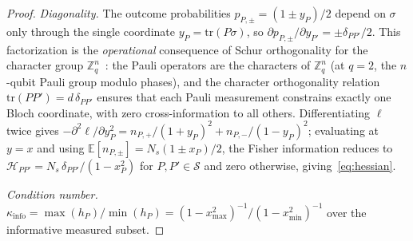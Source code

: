 \documentclass[twocolumn,prx,aps,superscriptaddress,longbibliography,floatfix]{revtex4-2}
\begin{document}
\begin{proof}
\emph{Diagonality.}
The outcome probabilities $p_{P,\pm} = (1 \pm y_P)/2$
depend on $\sigma$ only through the single coordinate
$y_P = \mathrm{tr}(P\sigma)$, so
$\partial p_{P,\pm}/\partial y_{P'} =
\pm\delta_{PP'}/2$.
This factorization is the \emph{operational} consequence of
Schur orthogonality for the character group
$\mathbb{Z}_q^n$~\cite{BannaiIto1984,Holevo2011}: the Pauli
operators are the characters of $\mathbb{Z}_q^n$ (at $q = 2$,
the $n$-qubit Pauli group modulo phases), and the character
orthogonality relation
$\mathrm{tr}(PP') = d\,\delta_{PP'}$ ensures that each Pauli
measurement constrains exactly one Bloch coordinate, with zero
cross-information to all others.
Differentiating $\ell$ twice gives $-\partial^2\ell/\partial y_P^2 =
n_{P,+}/(1+y_P)^2 + n_{P,-}/(1-y_P)^2$; evaluating at $y = x$ and using
$\mathbb{E}[n_{P,\pm}] = N_s(1\pm x_P)/2$, the Fisher information reduces to
$\mathcal{H}_{PP'} = N_s\,\delta_{PP'}/(1 - x_P^2)$ for
$P, P' \in \mathcal{S}$ and zero otherwise, giving~\eqref{eq:hessian}.

\emph{Condition number.}
$\kappa_{\mathrm{info}} = \max(h_P)/\min(h_P)
= (1 - x_{\max}^2)^{-1}/(1 - x_{\min}^2)^{-1}$ over the
informative measured subset.
\end{proof}
\end{document}
